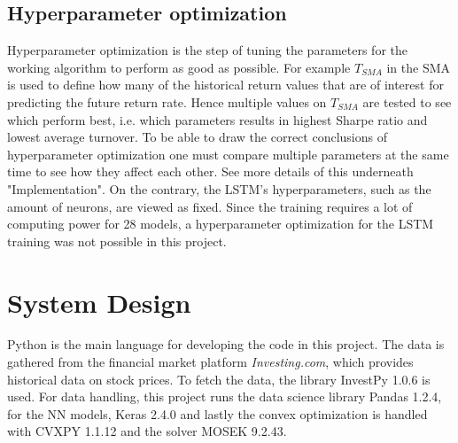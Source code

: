 \documentclass[final]{LTHtwocol} %
\begin{document}
\subsection{Hyperparameter optimization}
Hyperparameter optimization is the step of tuning the parameters for the working algorithm to perform as good as possible. For example $T_{SMA} $ in the SMA is used to define how many of the historical return values that are of interest for predicting the future return rate. Hence multiple values on $T_{SMA}$ are tested to see which perform best, i.e. which parameters results in highest Sharpe ratio and lowest average turnover. To be able to draw the correct conclusions of hyperparameter optimization one must compare multiple parameters at the same time to see how they affect each other. See more details of this underneath "Implementation".
On the contrary, the LSTM's hyperparameters, such as the amount of neurons, are viewed as fixed. Since the training requires a lot of computing power for 28 models, a hyperparameter optimization for the LSTM training was not possible in this project.  


\section{System Design}


Python is the main language for developing the code in this project. The data is gathered from the financial market platform \textit{Investing.com}, which provides historical data on stock prices. To fetch the data, the library InvestPy 1.0.6 is used. For data handling, this project runs the data science library Pandas 1.2.4, for the NN models, Keras 2.4.0 and lastly the convex optimization is handled with CVXPY 1.1.12 and the solver MOSEK 9.2.43.
\end{document}
